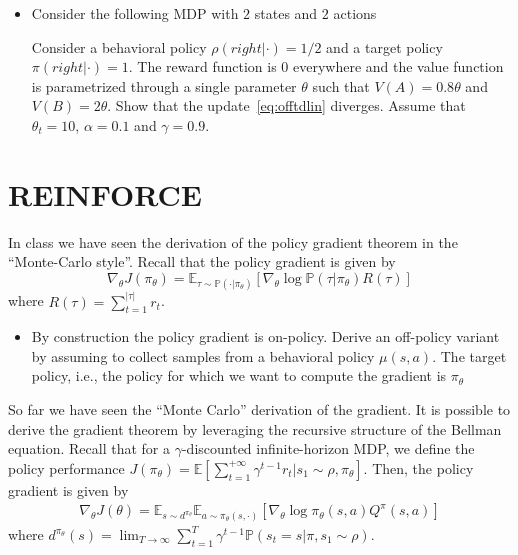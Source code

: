 \documentclass[a4paper]{article}
\begin{document}
\begin{itemize}
    \item Consider the following MDP with $2$ states and $2$ actions
    \begin{center}
    \end{center}
    Consider a behavioral policy $\rho(right| \cdot) = 1/2$ and a target policy $\pi(right|\cdot) = 1$. 
    The reward function is $0$ everywhere and the value function is parametrized through a single parameter $\theta$ such that $V(A)= 0.8\theta$ and $V(B) = 2\theta$.
    Show that the update~\eqref{eq:offtdlin} diverges. Assume that $\theta_t = 10$, $\alpha = 0.1$ and $\gamma =0.9$.
\end{itemize}

\section{REINFORCE}
In class we have seen the derivation of the policy gradient theorem in the ``Monte-Carlo style''. Recall that the policy gradient is given by
\[
    \nabla_\theta J(\pi_\theta) = \mathbb{E}_{\tau \sim \mathbb{P}(\cdot|\pi_\theta)}\left[ \nabla_\theta \log \mathbb{P}(\tau|\pi_\theta) 
    R(\tau)
    \right]
\]
where $R(\tau) = \sum_{t=1}^{|\tau|} r_t$. %

\begin{itemize}
    \item By construction the policy gradient is on-policy. Derive an off-policy variant by assuming to collect samples from a behavioral policy $\mu(s,a)$. The target policy, i.e., the policy for which we want to compute the gradient is $\pi_{\theta}$
\end{itemize}

So far we have seen the ``Monte Carlo'' derivation of the gradient.
It is possible to derive the gradient theorem by leveraging the recursive structure of the Bellman equation. Recall that for a $\gamma$-discounted infinite-horizon MDP, we define the policy performance $J(\pi_\theta) = \mathbb{E}\left[\sum_{t=1}^{+\infty} \gamma^{t-1} r_t | s_1 \sim \rho, \pi_\theta \right]$. Then, the policy gradient is given by
\begin{align}
    \label{eq:pgt}
    \nabla_\theta J(\theta) = \mathbb{E}_{s \sim d^{\pi_\theta}} \mathbb{E}_{a \sim \pi_\theta(s, \cdot)}
    \left[ 
        \nabla_{\theta} \log \pi_\theta(s,a) Q^\pi(s,a)
    \right]
\end{align}
where $d^{\pi_\theta}(s) = \lim_{T \to \infty} \sum_{t=1}^{T} \gamma^{t-1} \mathbb{P}(s_t=s|\pi,s_1 \sim \rho)$.
\end{document}
